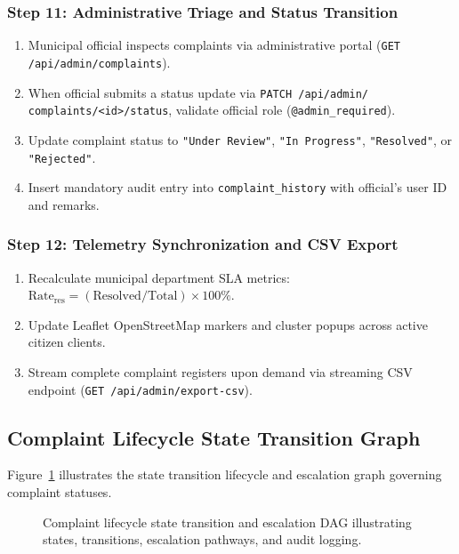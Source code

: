 \documentclass[12pt,a4paper]{report}
\begin{document}
\subsubsection*{Step 11: Administrative Triage and Status Transition}
\begin{enumerate}
  \item[\textbf{11.1}] Municipal official inspects complaints via administrative portal (\texttt{GET /api/admin/complaints}).
  \item[\textbf{11.2}] When official submits a status update via \texttt{PATCH /api/admin/} \allowbreak \texttt{complaints/<id>/status}, validate official role (\texttt{@admin\_required}).
  \item[\textbf{11.3}] Update complaint status to \texttt{"Under Review"}, \texttt{"In Progress"}, \texttt{"Resolved"}, or \texttt{"Rejected"}.
  \item[\textbf{11.4}] Insert mandatory audit entry into \texttt{complaint\_history} with official's user ID and remarks.
\end{enumerate}

\subsubsection*{Step 12: Telemetry Synchronization and CSV Export}
\begin{enumerate}
  \item[\textbf{12.1}] Recalculate municipal department SLA metrics: $\mathrm{Rate}_{\text{res}} = (\mathrm{Resolved} / \mathrm{Total}) \times 100\%$.
  \item[\textbf{12.2}] Update Leaflet OpenStreetMap markers and cluster popups across active citizen clients.
  \item[\textbf{12.3}] Stream complete complaint registers upon demand via streaming CSV endpoint (\texttt{GET /api/admin/export-csv}).
\end{enumerate}

\subsection{Complaint Lifecycle State Transition Graph}
Figure~\ref{fig:dag_scheduling_walkthrough} illustrates the state transition lifecycle and escalation graph governing complaint statuses.

\begin{figure}[H]
    \centering
    \caption{Complaint lifecycle state transition and escalation DAG illustrating states, transitions, escalation pathways, and audit logging.}
    \label{fig:dag_scheduling_walkthrough}
\end{figure}
\end{document}
